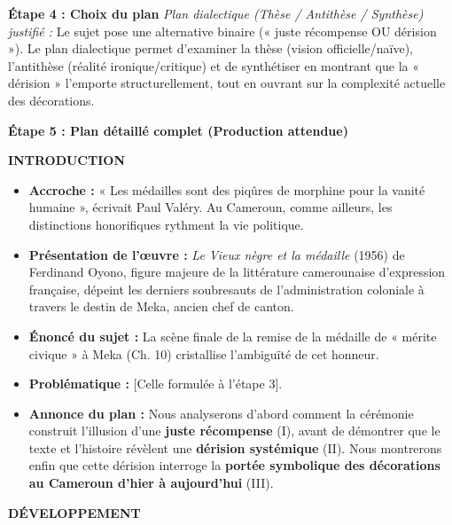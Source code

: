 \documentclass[11pt]{article}
\begin{document}
\begin{exoresolu}
\textbf{Étape 4 : Choix du plan}
\emph{Plan dialectique (Thèse / Antithèse / Synthèse) justifié :} Le sujet pose une alternative binaire (« juste récompense OU dérision »). Le plan dialectique permet d'examiner la thèse (vision officielle/naïve), l'antithèse (réalité ironique/critique) et de synthétiser en montrant que la « dérision » l'emporte structurellement, tout en ouvrant sur la complexité actuelle des décorations.

\textbf{Étape 5 : Plan détaillé complet (Production attendue)}

\medskip
\noindent \textbf{INTRODUCTION}
\begin{itemize}
    \item \textbf{Accroche :} « Les médailles sont des piqûres de morphine pour la vanité humaine », écrivait Paul Valéry. Au Cameroun, comme ailleurs, les distinctions honorifiques rythment la vie politique.
    \item \textbf{Présentation de l'œuvre :} \emph{Le Vieux nègre et la médaille} (1956) de Ferdinand Oyono, figure majeure de la littérature camerounaise d'expression française, dépeint les derniers soubresauts de l'administration coloniale à travers le destin de Meka, ancien chef de canton.
    \item \textbf{Énoncé du sujet :} La scène finale de la remise de la médaille de « mérite civique » à Meka (Ch. 10) cristallise l'ambiguïté de cet honneur.
    \item \textbf{Problématique :} [Celle formulée à l'étape 3].
    \item \textbf{Annonce du plan :} Nous analyserons d'abord comment la cérémonie construit l'illusion d'une \textbf{juste récompense} (I), avant de démontrer que le texte et l'histoire révèlent une \textbf{dérision systémique} (II). Nous montrerons enfin que cette dérision interroge la \textbf{portée symbolique des décorations au Cameroun d'hier à aujourd'hui} (III).
\end{itemize}

\medskip
\noindent \textbf{DÉVELOPPEMENT}


\end{exoresolu}
\end{document}
